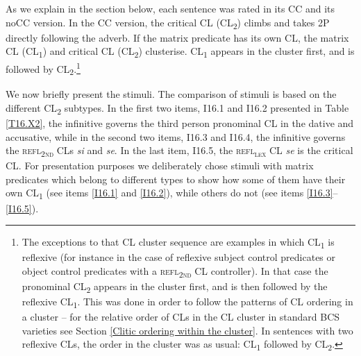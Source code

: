 As we explain in the section below, each sentence was rated in its CC and its noCC version. In the CC version, the critical CL (CL\textsubscript{2}) climbs and takes 2P directly following the adverb. If the matrix predicate has its own CL, the matrix CL (CL\textsubscript{1}) and critical CL (CL\textsubscript{2}) clusterise. CL\textsubscript{1} appears in the cluster first, and is followed by CL\textsubscript{2}.\footnote{The exceptions to that CL cluster sequence are examples in which CL\textsubscript{1} is reflexive (for instance in the case of reflexive subject control predicates or object control predicates with a \textsc{refl\textsubscript{2nd}} CL controller). In that case the pronominal CL\textsubscript{2} appears in the cluster first, and is then followed by the reflexive CL\textsubscript{1}. This was done in order to follow the patterns of CL ordering in a cluster – for the relative order of CLs in the CL cluster in standard BCS varieties see Section \ref{Clitic ordering within the cluster}. In sentences with two reflexive CLs, the order in the cluster was as usual: CL\textsubscript{1} followed by CL\textsubscript{2}.}

We now briefly present the stimuli. The comparison of stimuli is based on the different CL\textsubscript{2} subtypes. In the first two items, I16.1 and I16.2 presented in Table \ref{T16.X2}, the infinitive governs the third person pronominal CL in the dative and accusative, while in the second two items, I16.3 and I16.4, the infinitive governs the \textsc{refl\textsubscript{2nd}} CLs \textit{si} and \textit{se}. In the last item, I16.5, the \textsc{refl\textsubscript{\textsc{lex}}} CL \textit{se} is the critical CL. For presentation purposes we deliberately chose stimuli with matrix predicates which belong to different types to show how some of them have their own CL\textsubscript{1} (see items \ref{I16.1} and \ref{I16.2}), while others do not (see items \ref{I16.3}--\ref{I16.5}). 

